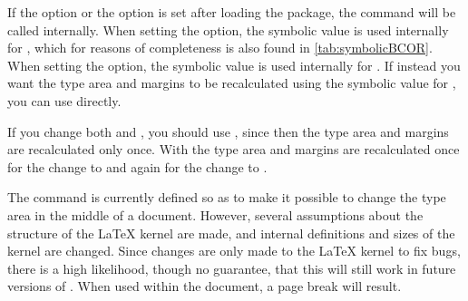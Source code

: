 \begin{Declaration}
\end{Declaration}%
\begin{Explain}
  If the  option or the
   option is set after loading the
   package, the  command will be called
  internally. When setting the  option, the
  symbolic value  is used internally for , which
  for reasons of completeness is also found in \autoref{tab:symbolicBCOR}.
  When setting the  option, the symbolic value
   is used internally for . If instead you want the
  type area and margins to be recalculated using the symbolic value
   for , you can use
   directly.
\end{Explain}

\begin{table}
  \caption[{%
    Symbolic  arguments for %
  }]{%
    Available symbolic  arguments for
  }
  \label{tab:symbolicBCOR}
  \begin{desctabular}
  \end{desctabular}
\end{table}

If you change both  and , you should use
, since then the type area and margins are recalculated only
once. With %
 the type area and margins are
recalculated once for the change to  and again
for the change to .

\begin{Explain}
  The command  is currently defined so as to make it possible
  to change the type area in the middle of a document. However, several
  assumptions about the structure of the {\LaTeX} kernel are made, and
  internal definitions and sizes of the kernel are changed. Since changes are
  only made to the {\LaTeX} kernel to fix bugs, there is a high likelihood,
  though no guarantee, that this will still work in future versions of
  \LaTeXe{}. When used within the document, a page break will result.
\end{Explain}

